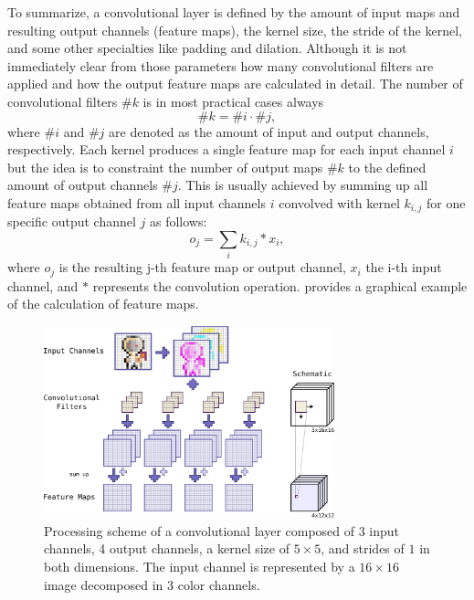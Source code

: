 To summarize, a convolutional layer is defined by the amount of input maps and resulting output channels (feature maps), the kernel size, the stride of the kernel, and some other specialties like padding and dilation.
Although it is not immediately clear from those parameters how many convolutional filters are applied and how the output feature maps are calculated in detail.
The number of convolutional filters $\#k$ is in most practical cases always
\begin{equation}\label{eq:nn_theory_n_filters}
  \#k = \#i \cdot \#j,
\end{equation}
where $\#i$ and $\#j$ are denoted as the amount of input and output channels, respectively.
Each kernel produces a single feature map for each input channel $i$ but the idea is to constraint the number of output maps $\#k$ to the defined amount of output channels $\#j$.
This is usually achieved by summing up all feature maps obtained from all input channels $i$ convolved with kernel $k_{i, j}$ for one specific output channel $j$ as follows:
\begin{equation}
  o_j = \sum_{i} k_{i, j} \ast x_i,
\end{equation}
where $o_j$ is the resulting j-th feature map or output channel, $x_i$ the i-th input channel, and $\ast$ represents the convolution operation.
 provides a graphical example of the calculation of feature maps.
\begin{figure}[!ht]
  \centering
    \includegraphics[width=0.75\textwidth]{./4_nn/figs/nn_theory_cnn_basics.pdf}
  \caption{Processing scheme of a convolutional layer composed of 3 input channels, 4 output channels, a kernel size of $5 \times 5$, and strides of $1$ in both dimensions. The input channel is represented by a $16 \times 16$ image decomposed in 3 color channels.}
  \label{fig:nn_theory_cnn_basics}
\end{figure}
\FloatBarrier
\noindent

